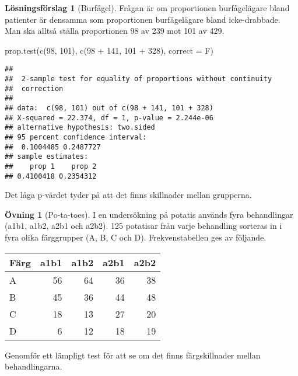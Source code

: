 \documentclass[
]{book}
\newenvironment{Shaded}{\begin{snugshade}}{\end{snugshade}}
\newcommand{\AttributeTok}[1]{\textcolor[rgb]{0.77,0.63,0.00}{#1}}
\newcommand{\DecValTok}[1]{\textcolor[rgb]{0.00,0.00,0.81}{#1}}
\newcommand{\FunctionTok}[1]{\textcolor[rgb]{0.00,0.00,0.00}{#1}}
\newcommand{\NormalTok}[1]{#1}
\newcommand{\SpecialCharTok}[1]{\textcolor[rgb]{0.00,0.00,0.00}{#1}}
\theoremstyle{definition}
\theoremstyle{definition}
\theoremstyle{definition}
\newtheorem{exercise}{Övning}[chapter]
\theoremstyle{definition}
\newtheorem{hypothesis}{Lösningsförslag}[chapter]
\theoremstyle{remark}
\begin{document}
\begin{hypothesis}[Burfågel]
Frågan är om proportionen burfågelägare bland patienter är densamma som proportionen burfågelägare bland icke-drabbade. Man ska alltså ställa proportionen 98 av 239 mot 101 av 429.

\begin{Shaded}
\begin{Highlighting}[]
\FunctionTok{prop.test}\NormalTok{(}\FunctionTok{c}\NormalTok{(}\DecValTok{98}\NormalTok{, }\DecValTok{101}\NormalTok{), }\FunctionTok{c}\NormalTok{(}\DecValTok{98} \SpecialCharTok{+} \DecValTok{141}\NormalTok{, }\DecValTok{101} \SpecialCharTok{+} \DecValTok{328}\NormalTok{), }\AttributeTok{correct =}\NormalTok{ F)}
\end{Highlighting}
\end{Shaded}

\begin{verbatim}
## 
##  2-sample test for equality of proportions without continuity
##  correction
## 
## data:  c(98, 101) out of c(98 + 141, 101 + 328)
## X-squared = 22.374, df = 1, p-value = 2.244e-06
## alternative hypothesis: two.sided
## 95 percent confidence interval:
##  0.1004485 0.2487727
## sample estimates:
##    prop 1    prop 2 
## 0.4100418 0.2354312
\end{verbatim}

Det låga p-värdet tyder på att det finns skillnader mellan grupperna.
\end{hypothesis}

\begin{exercise}[Po-ta-toes]
I en undersökning på potatis används fyra behandlingar (a1b1, a1b2, a2b1 och a2b2). 125 potatisar från varje behandling sorteras in i fyra olika färggrupper (A, B, C och D). Frekvenstabellen ges av följande.

\begin{table}
\centering
\begin{tabular}[t]{lrrrr}
\toprule
Färg & a1b1 & a1b2 & a2b1 & a2b2\\
\midrule
A & 56 & 64 & 36 & 38\\
B & 45 & 36 & 44 & 48\\
C & 18 & 13 & 27 & 20\\
D & 6 & 12 & 18 & 19\\
\bottomrule
\end{tabular}
\end{table}

Genomför ett lämpligt test för att se om det finns färgskillnader mellan behandlingarna.
\end{exercise}
\end{document}
